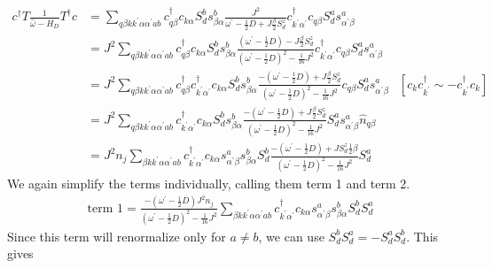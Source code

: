 \documentclass{revtex4-2}
\numberwithin{equation}{section}
\begin{document}
\begin{align}
	c^\dagger T \frac{1}{\hat \omega - H_D}T^\dagger c &= \sum_{q\beta k k^\prime \alpha \alpha^\prime a b} c^\dagger_{q\beta} c_{k\alpha} S_d^b s^b_{\beta \alpha} \frac{J^2}{\omega^\prime - \frac{1}{2}D + J \frac{\beta}{2}S_d^z }c^\dagger_{k^\prime\alpha^\prime} c_{q\beta} S_d^a s^a_{\alpha^\prime \beta} \\
							   &= J^2\sum_{q\beta k k^\prime \alpha \alpha^\prime a b} c^\dagger_{q\beta} c_{k\alpha} S_d^b s^b_{\beta \alpha} \frac{\left(\omega^\prime - \frac{1}{2}D\right) - J \frac{\beta}{2}S_d^z }{\left(\omega^\prime - \frac{1}{2}D\right)^2 - \frac{1}{16}J^2}c^\dagger_{k^\prime\alpha^\prime} c_{q\beta} S_d^a s^a_{\alpha^\prime \beta}\\
							   &= J^2\sum_{q\beta k k^\prime \alpha \alpha^\prime a b} c^\dagger_{q\beta} c^\dagger_{k^\prime\alpha^\prime}c_{k\alpha} S_d^b s^b_{\beta \alpha} \frac{-\left(\omega^\prime - \frac{1}{2}D\right) + J \frac{\beta}{2}S_d^z}{\left(\omega^\prime - \frac{1}{2}D\right)^2 - \frac{1}{16}J^2} c_{q\beta} S_d^a s^a_{\alpha^\prime \beta} & \left[c_k c^\dagger_{k^\prime} \sim - c^\dagger_{k^\prime}c_k\right] \\
							   &= J^2\sum_{q\beta k k^\prime \alpha \alpha^\prime a b} c^\dagger_{k^\prime\alpha^\prime}c_{k\alpha} S_d^b s^b_{\beta \alpha} \frac{-\left(\omega^\prime - \frac{1}{2}D\right) + J \frac{\beta}{2}S_d^z}{\left(\omega^\prime - \frac{1}{2}D\right)^2 - \frac{1}{16}J^2} S_d^a s^a_{\alpha^\prime \beta} \hat n_{q\beta} \\
							   &= J^2 n_j \sum_{\beta k k^\prime \alpha \alpha^\prime a b} c^\dagger_{k^\prime\alpha^\prime}c_{k\alpha} s^a_{\alpha^\prime \beta}s^b_{\beta \alpha} S_d^b \frac{-\left(\omega^\prime - \frac{1}{2}D\right) + J S_d^z \frac{1}{2}\beta}{\left(\omega^\prime - \frac{1}{2}D\right)^2 - \frac{1}{16}J^2} S_d^a 
\end{align}
We again simplify the terms individually, calling them term 1 and term 2. 
\begin{equation}\begin{aligned}
	\text{term 1} = \frac{-\left(\omega^\prime - \frac{1}{2}D\right)J^2 n_j} {\left(\omega^\prime - \frac{1}{2}D\right)^2 - \frac{1}{16}J^2} \sum_{\beta k k^\prime \alpha \alpha^\prime a b} c^\dagger_{k^\prime\alpha^\prime}c_{k\alpha} s^a_{\alpha^\prime \beta}s^b_{\beta \alpha} S_d^b S_d^a
\end{aligned}\end{equation}
Since this term will renormalize only for \(a \neq b\), we can use \(S_d^b S_d^a = -S_d^a S_d^b\). This gives
\end{document}
